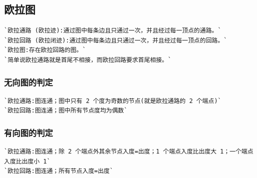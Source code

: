 \documentclass[a4paper]{article}
\begin{document}
\begin{CJK*}{UTF8}{gbsn}
\begin{multicols}{3}
\begin{flushleft}
\subsection{欧拉图}
\begin{lstlisting}
`欧拉通路 (欧拉迹):通过图中每条边且只通过一次，并且经过每一顶点的通路。`
`欧拉回路 (欧拉闭迹):通过图中每条边且只通过一次，并且经过每一顶点的回路。`
`欧拉图:存在欧拉回路的图。`
`简单说欧拉通路就是首尾不相接，而欧拉回路要求首尾相接。`
\end{lstlisting}

\subsubsection{无向图的判定}
\begin{lstlisting}
`欧拉通路:图连通；图中只有 2 个度为奇数的节点(就是欧拉通路的 2 个端点)`
`欧拉回路:图连通；图中所有节点度均为偶数`
\end{lstlisting}

\subsubsection{有向图的判定}
\begin{lstlisting}
`欧拉通路:图连通；除 2 个端点外其余节点入度=出度；1 个端点入度比出度大 1；一个端点入度比出度小 1`
`欧拉回路:图连通；所有节点入度=出度`
\end{lstlisting}


\end{flushleft}
\end{multicols}
\end{CJK*}
\end{document}
